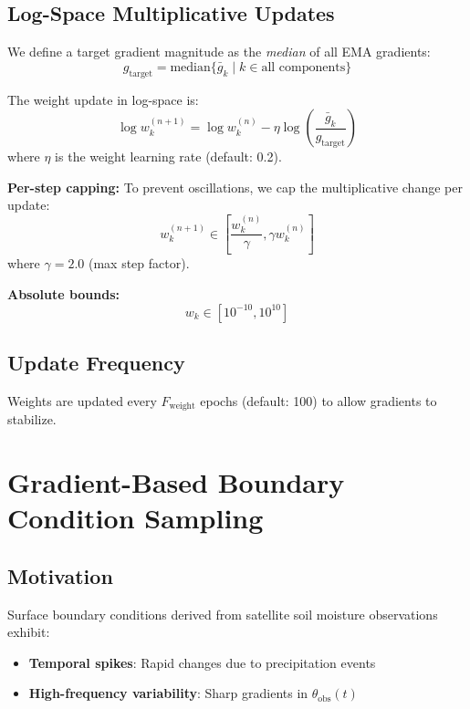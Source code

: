 \documentclass[11pt,a4paper]{article}
\begin{document}
\subsection{Log-Space Multiplicative Updates}

We define a target gradient magnitude as the \textit{median} of all EMA gradients:
\begin{equation}
    g_{\text{target}} = \text{median}\{\bar{g}_k \mid k \in \text{all components}\}
\end{equation}

The weight update in log-space is:
\begin{equation}
    \log w_k^{(n+1)} = \log w_k^{(n)} - \eta \log\left(\frac{\bar{g}_k}{g_{\text{target}}}\right)
\end{equation}
where $\eta$ is the weight learning rate (default: 0.2).

\textbf{Per-step capping:} To prevent oscillations, we cap the multiplicative change per update:
\begin{equation}
    w_k^{(n+1)} \in \left[\frac{w_k^{(n)}}{\gamma}, \gamma w_k^{(n)}\right]
\end{equation}
where $\gamma = 2.0$ (max step factor).

\textbf{Absolute bounds:}
\begin{equation}
    w_k \in [10^{-10}, 10^{10}]
\end{equation}

\subsection{Update Frequency}

Weights are updated every $F_{\text{weight}}$ epochs (default: 100) to allow gradients to stabilize.

\section{Gradient-Based Boundary Condition Sampling}

\subsection{Motivation}

Surface boundary conditions derived from satellite soil moisture observations exhibit:
\begin{itemize}
    \item \textbf{Temporal spikes}: Rapid changes due to precipitation events
    \item \textbf{High-frequency variability}: Sharp gradients in $\theta_{\text{obs}}(t)$
\end{itemize}
\end{document}
